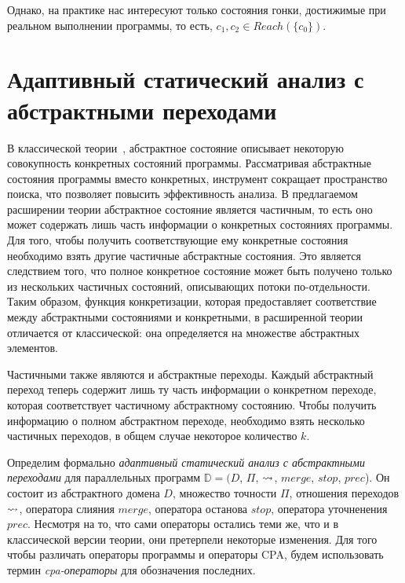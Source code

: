 Однако, на практике нас интересуют только состояния гонки, достижимые при реальном выполнении программы, то есть, $c_1, c_2 \in Reach(\{c_0\})$.



\section{Адаптивный статический анализ с абстрактными переходами}
\label{sect_cpata}

\newcommand{\update}{update}
\newcommand{\frontier}{frontier}

В классической теории~\cite{BeyerCPA07,Beyer08}, абстрактное состояние описывает некоторую совокупность конкретных состояний программы.
Рассматривая абстрактные состояния программы вместо конкретных, инструмент сокращает пространство поиска, что позволяет повысить эффективность анализа.
В предлагаемом расширении теории абстрактное состояние является частичным, то есть оно может содержать лишь часть информации о конкретных состояниях программы.
Для того, чтобы получить соответствующие ему конкретные состояния необходимо взять другие частичные абстрактные состояния.
Это является следствием того, что полное конкретное состояние может быть получено только из нескольких частичных состояний, описывающих потоки по-отдельности.
Таким образом, функция конкретизации, которая предоставляет соответствие между абстрактными состояниями и конкретными, в расширенной теории отличается от классической: она определяется на множестве абстрактных элементов.

Частичными также являются и абстрактные переходы.
Каждый абстрактный переход теперь содержит лишь ту часть информации о конкретном переходе, которая соответствует частичному абстрактному состоянию. 
Чтобы получить информацию о полном абстрактном переходе, необходимо взять несколько частичных переходов, в общем случае некоторое количество $k$.

Определим формально \emph{адаптивный статический анализ с абстрактными переходами} для параллельных программ $\mathbb{D}=(D$, $\Pi$, $\leadsto$, $merge$, $stop$, $prec$).
Он состоит из абстрактного домена $D$, 
множество точности $\Pi$, 
отношения переходов $\leadsto$,
оператора слияния $merge$, оператора останова $stop$, оператора уточненения $prec$.
Несмотря на то, что сами операторы остались теми же, что и в классической версии теории, они претерпели некоторые изменения.
Для того чтобы различать операторы программы и операторы CPA, будем использовать термин \textit{cpa-операторы} для обозначения последних.

